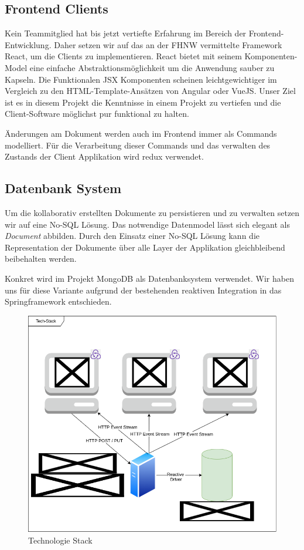 \subsection{Frontend Clients}
Kein Teammitglied hat bis jetzt vertiefte Erfahrung im Bereich der Frontend-Entwicklung.
Daher setzen wir auf das an der FHNW vermittelte Framework React, um die Clients zu implementieren.
React bietet mit seinem Komponenten-Model eine einfache Abstraktionsmöglichkeit um die Anwendung sauber zu Kapseln.
Die Funktionalen JSX Komponenten scheinen leichtgewichtiger im Vergleich zu den HTML-Template-Ansätzen von Angular oder VueJS\@.
Unser Ziel ist es in diesem Projekt die Kenntnisse in einem Projekt zu vertiefen und die Client-Software möglichst pur funktional zu halten.

Änderungen am Dokument werden auch im Frontend immer als Commands modelliert.
Für die Verarbeitung dieser Commands und das verwalten des Zustands der Client Applikation wird redux verwendet.

\subsection{Datenbank System}
Um die kollaborativ erstellten Dokumente zu persistieren und zu verwalten setzen wir auf eine No-SQL Lösung.
Das notwendige Datenmodel lässt sich elegant als \emph{Document} abbilden.
Durch den Einsatz einer No-SQL Lösung kann die Representation der Dokumente über alle Layer der Applikation gleichbleibend beibehalten werden\@.

Konkret wird im Projekt MongoDB als Datenbanksystem verwendet.
Wir haben uns für diese Variante aufgrund der bestehenden reaktiven Integration in das Springframework entschieden.


\begin{figure}
    \includegraphics[width=\textwidth,height=\textheight,keepaspectratio]{images/TechStack}
    \caption{Technologie Stack}
\end{figure}
